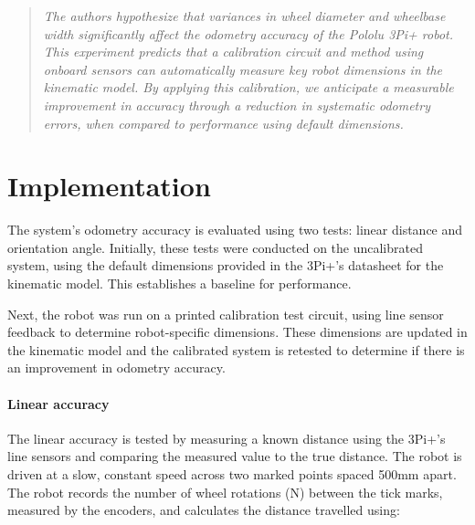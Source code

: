 \documentclass[conference]{IEEEtran}
\begin{document}
\begin{quote}
    \emph{
    The authors hypothesize that variances in wheel diameter and wheelbase width significantly affect the odometry accuracy of the Pololu 3Pi+ robot.
    This experiment predicts that a calibration circuit and method using onboard sensors can automatically measure key robot dimensions in the kinematic model.
    By applying this calibration, we anticipate a measurable improvement in accuracy through a reduction in systematic odometry errors, when compared to performance using default dimensions.
    }
\end{quote}





\section{Implementation}\label{sec:implementation}

The system's odometry accuracy is evaluated using two tests: linear distance and orientation angle. 
Initially, these tests were conducted on the uncalibrated system, using the default dimensions provided in the 3Pi+’s datasheet for the kinematic model. This establishes a baseline for performance.

Next, the robot was run on a printed calibration test circuit, using line sensor feedback to determine robot-specific dimensions. 
These dimensions are updated in the kinematic model and the calibrated system is retested to determine if there is an improvement in odometry accuracy.

\paragraph{Linear accuracy} The linear accuracy is tested by measuring a known distance using the 3Pi+'s line sensors and comparing the measured value to the true distance.
The robot is driven at a slow, constant speed across two marked points spaced 500mm apart.
The robot records the number of wheel rotations (N) between the tick marks, measured by the encoders, and calculates the distance travelled using:
\end{document}
